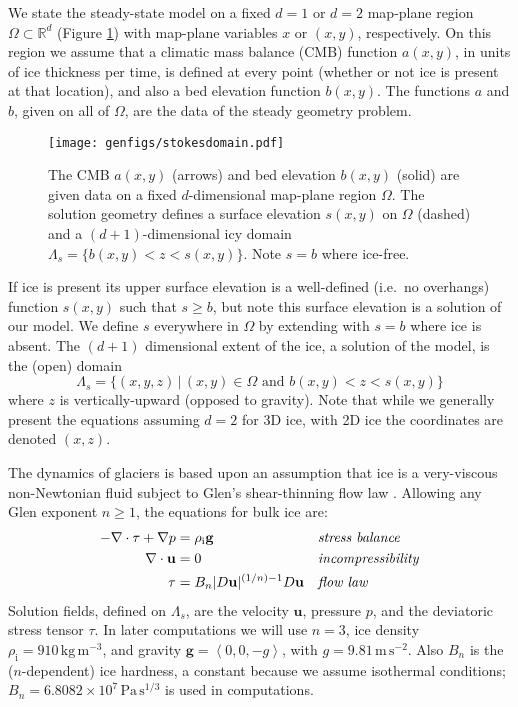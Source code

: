 \documentclass[letterpaper,final,12pt,reqno]{amsart}
\theoremstyle{claim}
\newcommand{\RR}{\mathbb{R}}
\newcommand{\bg}{\mathbf{g}}
\newcommand{\bu}{\mathbf{u}}
\newcommand{\rhoi}{\rho_{\text{i}}}
\numberwithin{equation}{section}
\numberwithin{figure}{section}
\numberwithin{table}{section}
\numberwithin{theorem}{section}
\begin{document}
We state the steady-state model on a fixed $d=1$ or $d=2$ map-plane region $\Omega \subset \RR^d$ (Figure \ref{fig:stokesdomain}) with map-plane variables $x$ or $(x,y)$, respectively.  On this region we assume that a climatic mass balance (CMB) function $a(x,y)$, in units of ice thickness per time, is defined at every point (whether or not ice is present at that location), and also a bed elevation function $b(x,y)$.  The functions $a$ and $b$, given on all of $\Omega$, are the data of the steady geometry problem.

\begin{figure}[ht]
\begin{center}
\texttt{[image: genfigs/stokesdomain.pdf]}
\end{center}
\caption{The CMB $a(x,y)$ (arrows) and bed elevation $b(x,y)$ (solid) are given data on a fixed $d$-dimensional map-plane region $\Omega$.  The solution geometry defines a surface elevation $s(x,y)$ on $\Omega$ (dashed) and a $(d+1)$-dimensional icy domain $\Lambda_s = \{b(x,y) < z < s(x,y)\}$.  Note $s=b$ where ice-free.}
\label{fig:stokesdomain}
\end{figure}

If ice is present its upper surface elevation is a well-defined (i.e.~no overhangs) function $s(x,y)$ such that $s\ge b$, but note this surface elevation is a solution of our model.  We define $s$ everywhere in $\Omega$ by extending with $s=b$ where ice is absent.  The $(d+1)$ dimensional extent of the ice, a solution of the model, is the (open) domain
\begin{equation}
\Lambda_s = \{(x,y,z)\,|\,(x,y) \in \Omega \text{ and } b(x,y) < z < s(x,y)\} \label{eq:lambdas}
\end{equation}
where $z$ is vertically-upward (opposed to gravity).  Note that while we generally present the equations assuming $d=2$ for 3D ice, with 2D ice the coordinates are denoted $(x,z)$.

The dynamics of glaciers is based upon an assumption that ice is a very-viscous non-Newtonian fluid subject to Glen's shear-thinning flow law \cite{GreveBlatter2009}.  Allowing any Glen exponent $n\ge 1$, the equations \cite[Chapter 1]{FowlerNg2021} for bulk ice are:
\begin{align}
- \nabla \cdot \tau + \nabla p &= \rhoi \bg &&\text{\emph{stress balance}} \label{eq:forcebalance} \\
\nabla \cdot \bu &= 0 &&\text{\emph{incompressibility}} \label{eq:incompressible} \\
\tau &= B_n |D\bu|^{(1/n) - 1} D\bu  &&\text{\emph{flow law}} \label{eq:viscflowlaw}
\end{align}
Solution fields, defined on $\Lambda_s$, are the velocity $\bu$, pressure $p$, and the deviatoric stress tensor $\tau$.  In later computations we will use $n=3$, ice density $\rhoi=910 \,\text{kg}\,\text{m}^{-3}$, and gravity $\bg=\left<0,0,-g\right>$, with $g=9.81\,\text{m}\,\text{s}^{-2}$.  Also $B_n$ is the ($n$-dependent) ice hardness, a constant because we assume isothermal conditions; $B_n=6.8082\times 10^7\,\text{Pa}\,\text{s}^{1/3}$ is used in computations.
\end{document}
